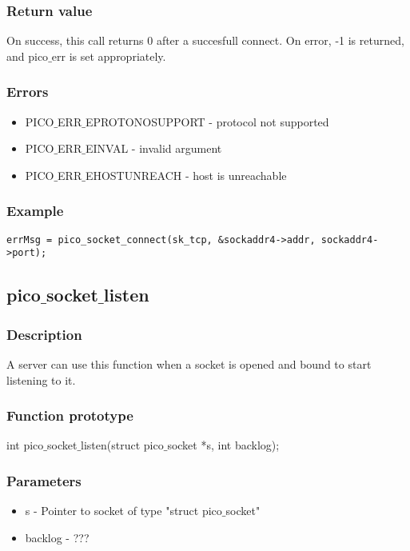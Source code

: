 \subsubsection*{Return value}
On success, this call returns 0 after a succesfull connect.
On error, -1 is returned, and pico$\_$err is set appropriately.

\subsubsection*{Errors}
\begin{itemize}
\item PICO$\_$ERR$\_$EPROTONOSUPPORT - protocol not supported
\item PICO$\_$ERR$\_$EINVAL - invalid argument
\item PICO$\_$ERR$\_$EHOSTUNREACH - host is unreachable 
\end{itemize}

\subsubsection*{Example}
\begin{verbatim}
errMsg = pico_socket_connect(sk_tcp, &sockaddr4->addr, sockaddr4->port);
\end{verbatim}


\subsection{pico$\_$socket$\_$listen}

\subsubsection*{Description}
A server can use this function when a socket is opened and bound to start listening to it.

\subsubsection*{Function prototype}
int pico$\_$socket$\_$listen(struct pico$\_$socket *s, int backlog);

\subsubsection*{Parameters}
\begin{itemize}
\item s - Pointer to socket of type "struct pico$\_$socket"
\item backlog - ???
\end{itemize}

